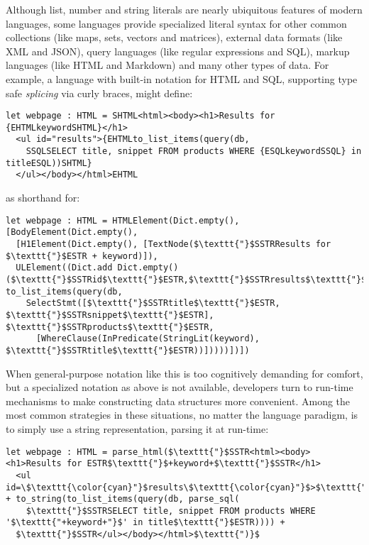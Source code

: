 Although list, number and string literals are nearly ubiquitous features of modern languages, some languages   provide specialized literal syntax for other common collections (like maps, sets, vectors and matrices), external data formats (like XML and JSON), query languages (like regular expressions and SQL), markup languages (like HTML and Markdown) and many other types of data. For example, a language with built-in notation for HTML and SQL, supporting type safe \emph{splicing} via curly braces, might define:
\begin{lstlisting}
let webpage : HTML = SHTML<html><body><h1>Results for {EHTMLkeywordSHTML}</h1>
  <ul id="results">{EHTMLto_list_items(query(db, 
    SSQLSELECT title, snippet FROM products WHERE {ESQLkeywordSSQL} in titleESQL))SHTML}
  </ul></body></html>EHTML
\end{lstlisting}
as shorthand for:
\begin{lstlisting}
let webpage : HTML = HTMLElement(Dict.empty(), [BodyElement(Dict.empty(),
  [H1Element(Dict.empty(), [TextNode($\texttt{"}$SSTRResults for $\texttt{"}$ESTR + keyword)]), 
  ULElement((Dict.add Dict.empty() ($\texttt{"}$SSTRid$\texttt{"}$ESTR,$\texttt{"}$SSTRresults$\texttt{"}$ESTR)), to_list_items(query(db, 
    SelectStmt([$\texttt{"}$SSTRtitle$\texttt{"}$ESTR, $\texttt{"}$SSTRsnippet$\texttt{"}$ESTR], $\texttt{"}$SSTRproducts$\texttt{"}$ESTR, 
      [WhereClause(InPredicate(StringLit(keyword), $\texttt{"}$SSTRtitle$\texttt{"}$ESTR))]))))])])
\end{lstlisting}

When general-purpose notation like this is too cognitively demanding for comfort, but a specialized notation as above is not available, developers turn to run-time mechanisms to make constructing data structures more convenient. Among the most common strategies in these situations, no matter the language paradigm, is to simply use a string representation, parsing it at run-time:%
\begin{lstlisting}
let webpage : HTML = parse_html($\texttt{"}$SSTR<html><body><h1>Results for ESTR$\texttt{"}$+keyword+$\texttt{"}$SSTR</h1>
  <ul id=\$\texttt{\color{cyan}"}$results\$\texttt{\color{cyan}"}$>$\texttt{"}$ESTR + to_string(to_list_items(query(db, parse_sql(
  	$\texttt{"}$SSTRSELECT title, snippet FROM products WHERE '$\texttt{"+keyword+"}$' in title$\texttt{"}$ESTR)))) + 
  $\texttt{"}$SSTR</ul></body></html>$\texttt{")}$
\end{lstlisting}


